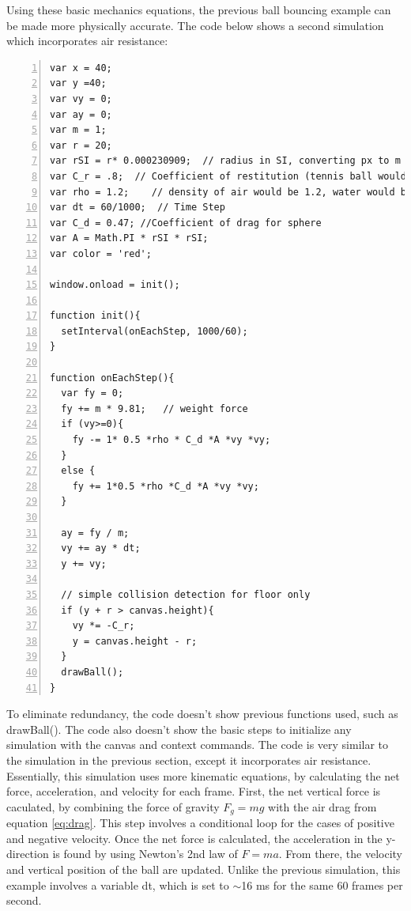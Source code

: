 Using these basic mechanics equations, the previous ball bouncing example can be made more physically accurate.  The code below shows a second simulation which incorporates air resistance:

\begin{lstlisting}[breaklines=true, frame=single, numbers=left, caption=More advanced ball bouncing simulation, label=lst:ballbounce2]
var x = 40;
var y =40;
var vy = 0;
var ay = 0;
var m = 1;
var r = 20;
var rSI = r* 0.000230909;  // radius in SI, converting px to m
var C_r = .8;  // Coefficient of restitution (tennis ball would be .8)
var rho = 1.2;    // density of air would be 1.2, water would be 1000
var dt = 60/1000;  // Time Step
var C_d = 0.47; //Coefficient of drag for sphere
var A = Math.PI * rSI * rSI;
var color = 'red';

window.onload = init();
  
function init(){
  setInterval(onEachStep, 1000/60);
}

function onEachStep(){ 
  var fy = 0;
  fy += m * 9.81;   // weight force
  if (vy>=0){
    fy -= 1* 0.5 *rho * C_d *A *vy *vy; 
  } 
  else {
    fy += 1*0.5 *rho *C_d *A *vy *vy;
  }

  ay = fy / m;
  vy += ay * dt;
  y += vy;
  
  // simple collision detection for floor only
  if (y + r > canvas.height){ 
    vy *= -C_r; 
    y = canvas.height - r;  
  }
  drawBall();
}
\end{lstlisting}

To eliminate redundancy, the code doesn't show previous functions used, such as drawBall().  The code also doesn't show the basic steps to initialize any simulation with the canvas and context commands.  The code is very similar to the simulation in the previous section, except it incorporates air resistance.  Essentially, this simulation uses more kinematic equations, by calculating the net force, acceleration, and velocity for each frame.  First, the net vertical force is caculated, by combining the force of gravity $F_g = mg$ with the air drag from equation \ref{eq:drag}.  This step involves a conditional loop for the cases of positive and negative velocity.  Once the net force is calculated, the acceleration in the y-direction is found by using Newton's 2nd law of $F = ma$.  From there, the velocity and vertical position of the ball are updated.  Unlike the previous simulation, this example involves a variable dt, which is set to $\sim$16 ms for the same 60 frames per second.   


